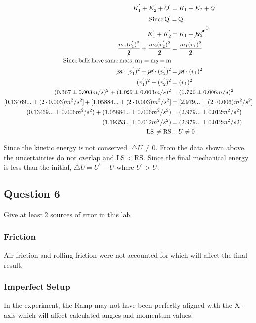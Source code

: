 \documentclass[12pt]{article}
\begin{document}
\begin{center}\begin{align*}
K_{1}^{'} + K_{2}^{'} + Q^{'} &= K_{1} + K_{2} + Q\\
\ce{Since Q^{'} &= Q}\\
K_{1}^{'} + K_{2}^{'} &= K_{1} + \cancelto{0}{K_{2}}\\
\frac{m_{1}(v_{1}^{'})^{2}}{\cancel{2}} + \frac{m_{2}(v_{2}^{'})^{2}}{\cancel{2}} &= \frac{m_{1}(v_{1})^{2}}{\cancel{2}}\\
\ce{Since balls have same mass, m_{1} = m_{2} = m}&\\
\cancel{m}\cdot{}(v_{1}^{'})^{2} + \cancel{m}\cdot{}(v_{2}^{'})^{2} &= \cancel{m}\cdot{}(v_{1})^{2}\\
(v_{1}^{'})^{2} + (v_{2}^{'})^{2} &= (v_{1})^{2}\\
(0.367\pm0.003m/s)^{2} + (1.029\pm0.003m/s)^{2} &= (1.726\pm0.006m/s)^{2}\\
[0.13469...\pm(2\cdot{}0.003)m^{2}/s^{2}] + [1.05884...\pm(2\cdot{}0.003)m^{2}/s^{2}] &= [2.979...\pm(2\cdot{}0.006)m^{2}/s^{2}]\\
(0.13469...\pm0.006m^{2}/s^{2}) + (1.05884...\pm0.006m^{2}/s^{2}) &= (2.979...\pm0.012m^{2}/s^{2})\\
(1.19353...\pm0.012m^{2}/s^{2}) &= (2.979...\pm0.012m^{2}/s{2})\\
\ce{LS \neq RS}& \therefore{} U \neq 0\\
\end{align*}\end{center}
\pagebreak
Since the kinetic energy is not conserved, $\triangle{U}\neq0$. From the data shown above, the uncertainties do not overlap and LS < RS. Since the final mechanical energy is less than the initial, $\triangle{U} = U^{'} - U$ where $U^{'} > U$. \\


\subsection{Question 6}
Give at least 2 sources of error in this lab.

\subsubsection{Friction}
Air friction and rolling friction were not accounted for which will affect the final result.

\subsubsection{Imperfect Setup}
In the experiment, the Ramp may not have been perfectly aligned with the X-axis which will affect calculated angles and momentum values.
\end{document}
